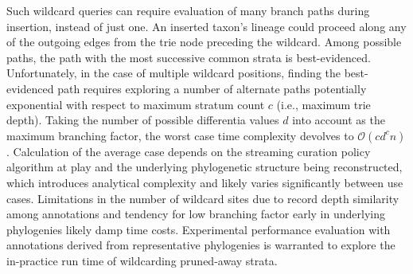 Such wildcard queries can require evaluation of many branch paths during insertion, instead of just one.
An inserted taxon's lineage could proceed along any of the outgoing edges from the trie node preceding the wildcard.
Among possible paths, the path with the most successive common strata is best-evidenced.
Unfortunately, in the case of multiple wildcard positions, finding the best-evidenced path requires exploring a number of alternate paths potentially exponential with respect to maximum stratum count $c$ (i.e., maximum trie depth).
Taking the number of possible differentia values $d$ into account as the maximum branching factor, the worst case time complexity devolves to $\mathcal{O}(c d^c n)$ \citep{fukuyama2016partial}.
Calculation of the average case depends on the streaming curation policy algorithm at play and the underlying phylogenetic structure being reconstructed, which introduces analytical complexity and likely varies significantly between use cases.
Limitations in the number of wildcard sites due to record depth similarity among annotations and tendency for low branching factor early in underlying phylogenies likely damp time costs.
Experimental performance evaluation with annotations derived from representative phylogenies is warranted to explore the in-practice run time of wildcarding pruned-away strata.



